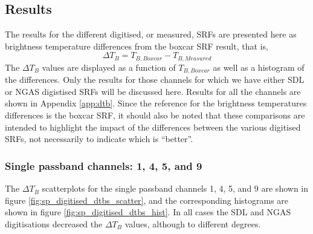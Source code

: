 \subsection{Results}
The results for the different digitised, or measured, SRFs are presented here as brightness temperature differences from the boxcar SRF result, that is,
\begin{equation}
  \Delta T_B = T_{B,Boxcar} - T_{B,Measured}
\end{equation}
The $\Delta T_B$ values are displayed as a function of $T_{B,Boxcar}$ as well as a histogram of the differences. Only the results for those channels for which we have either SDL or NGAS digistised SRFs will be discussed here. Results for all the channels are shown in Appendix \ref{app:dtb}. Since the reference for the brightness temperatures differences is the boxcar SRF, it should also be noted that these comparisons are intended to highlight the impact of the differences between the various digitised SRFs, not necessarily to indicate which is ``better''.

\subsubsection{Single passband channels: 1, 4, 5, and 9}
The $\Delta T_B$ scatterplots for the single passband channels 1, 4, 5, and 9 are shown in figure \ref{fig:sp_digitised_dtbs_scatter}, and the corresponding histograms are shown in figure \ref{fig:sp_digitised_dtbs_hist}. In all cases the SDL and NGAS digitisations decreased the $\Delta T_B$ values, although to different degrees.

